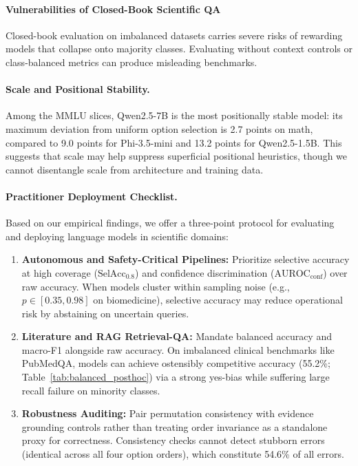 \documentclass[sigconf,nonacm]{acmart}
\makeatletter
\DeclareRobustCommand{\_}{\ifmmode\nfss@text{\textunderscore}\else\textunderscore\allowbreak\fi}
\makeatother
\begin{document}
\paragraph{Vulnerabilities of Closed-Book Scientific QA}
Closed-book evaluation on imbalanced datasets carries severe risks of rewarding models that collapse onto majority classes. Evaluating without context controls or class-balanced metrics can produce misleading benchmarks.

\paragraph{Scale and Positional Stability.}
Among the MMLU slices, \textsf{Qwen2.5-7B} is the most positionally stable model: its maximum deviation from uniform option selection is 2.7 points on math, compared to 9.0 points for \textsf{Phi-3.5-mini} and 13.2 points for \textsf{Qwen2.5-1.5B}. This suggests that scale may help suppress superficial positional heuristics, though we cannot disentangle scale from architecture and training data.

\paragraph{Practitioner Deployment Checklist.}
Based on our empirical findings, we offer a three-point protocol for evaluating and deploying language models in scientific domains:
\begin{enumerate}
    \item \textbf{Autonomous and Safety-Critical Pipelines:} Prioritize selective accuracy at high coverage ($\text{SelAcc}_{0.8}$) and confidence discrimination ($\text{AUROC}_{\text{conf}}$) over raw accuracy. When models cluster within sampling noise (e.g., $p \in [0.35, 0.98]$ on biomedicine), selective accuracy may reduce operational risk by abstaining on uncertain queries.
    \item \textbf{Literature and RAG Retrieval-QA:} Mandate balanced accuracy and macro-F1 alongside raw accuracy. On imbalanced clinical benchmarks like PubMedQA, models can achieve ostensibly competitive accuracy (55.2\%; Table~\ref{tab:balanced_posthoc}) via a strong yes-bias while suffering large recall failure on minority classes.
    \item \textbf{Robustness Auditing:} Pair permutation consistency with evidence grounding controls rather than treating order invariance as a standalone proxy for correctness. Consistency checks cannot detect stubborn errors (identical across all four option orders), which constitute 54.6\% of all errors.
\end{enumerate}
\end{document}
